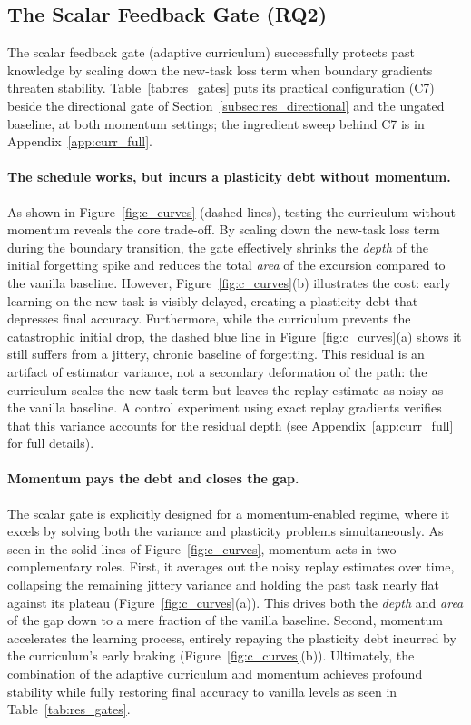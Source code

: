 \subsection{The Scalar Feedback Gate (RQ2)}
\label{subsec:res_scalar}

The scalar feedback gate (adaptive curriculum) successfully protects past knowledge by scaling down the new-task loss term when boundary gradients threaten stability. Table~\ref{tab:res_gates} puts its practical configuration (C7) beside the directional gate of Section~\ref{subsec:res_directional} and the ungated baseline, at both momentum settings; the ingredient sweep behind C7 is in Appendix~\ref{app:curr_full}.

\paragraph{The schedule works, but incurs a plasticity debt without momentum.}
As shown in Figure~\ref{fig:c_curves} (dashed lines), testing the curriculum without momentum reveals the core trade-off. By scaling down the new-task loss term during the boundary transition, the gate effectively shrinks the \emph{depth} of the initial forgetting spike and reduces the total \emph{area} of the excursion compared to the vanilla baseline. However, Figure~\ref{fig:c_curves}(b) illustrates the cost: early learning on the new task is visibly delayed, creating a plasticity debt that depresses final accuracy. Furthermore, while the curriculum prevents the catastrophic initial drop, the dashed blue line in Figure~\ref{fig:c_curves}(a) shows it still suffers from a jittery, chronic baseline of forgetting. This residual is an artifact of estimator variance, not a secondary deformation of the path: the curriculum scales the new-task term but leaves the replay estimate as noisy as the vanilla baseline. A control experiment using exact replay gradients verifies that this variance accounts for the residual depth (see Appendix~\ref{app:curr_full} for full details).

\paragraph{Momentum pays the debt and closes the gap.}
The scalar gate is explicitly designed for a momentum-enabled regime, where it excels by solving both the variance and plasticity problems simultaneously. As seen in the solid lines of Figure~\ref{fig:c_curves}, momentum acts in two complementary roles. First, it averages out the noisy replay estimates over time, collapsing the remaining jittery variance and holding the past task nearly flat against its plateau (Figure~\ref{fig:c_curves}(a)). This drives both the \emph{depth} and \emph{area} of the gap down to a mere fraction of the vanilla baseline. Second, momentum accelerates the learning process, entirely repaying the plasticity debt incurred by the curriculum's early braking (Figure~\ref{fig:c_curves}(b)). Ultimately, the combination of the adaptive curriculum and momentum achieves profound stability while fully restoring final accuracy to vanilla levels as seen in Table~\ref{tab:res_gates}.

